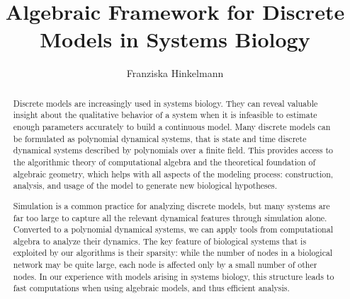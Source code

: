 \documentclass[11pt]{amsart}
\title{Algebraic Framework for Discrete Models in Systems Biology}
\author{Franziska Hinkelmann}
\begin{document}
\maketitle
\begin{abstract}
	
	Discrete models are increasingly used in systems biology. They can reveal
	valuable insight about the qualitative behavior of a system when it is
	infeasible to estimate enough parameters accurately to build a continuous
	model. Many discrete models can be formulated as polynomial dynamical systems,
	that is state and time discrete dynamical systems described by polynomials
	over a finite field. This provides access to the algorithmic theory of
	computational algebra and the theoretical foundation of algebraic geometry, 
	which helps with all aspects of the modeling process: construction,
	  analysis, and usage of the model to generate new biological hypotheses. 
	
	Simulation is a common practice for analyzing
	discrete models, but many systems are far too large to capture all the
	relevant dynamical features through simulation alone.  
	Converted to a polynomial dynamical systems, we can apply tools from computational algebra to analyze their dynamics. 
	 The key feature of biological systems that is exploited by our algorithms is their sparsity: 
	while the number of nodes in a biological network may be quite large, each node is affected only 
	by a small number of other nodes. In our experience with models arising in systems biology,
	 this structure leads to fast computations when using algebraic models, and thus efficient analysis.
	

\end{abstract}
\end{document}
